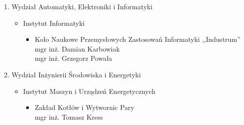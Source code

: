 \documentclass[ucs]{beamer}
\begin{document}
\begin{frame}
\begin{enumerate}
\setlength{\itemsep}{3pt}
\setlength{\parskip}{3pt}
\setlength{\parsep}{3pt}
\item Wydział Automatyki, Elektroniki i Informatyki
\begin{itemize}
\setlength{\itemsep}{3pt}
\setlength{\parskip}{3pt}
\setlength{\parsep}{3pt}
\item Instytut Informatyki
\begin{itemize}
\setlength{\itemsep}{3pt}
\setlength{\parskip}{3pt}
\setlength{\parsep}{3pt}
\item Koło Naukowe Przemysłowych Zastosowań Informatyki ,,Industrum''
\\ mgr inż. Damian Karbowiak
\\ mgr inż. Grzegorz Powała
\end{itemize}
\end{itemize}
\item  Wydział Inżynierii Środowiska i Energetyki
\begin{itemize}
\setlength{\itemsep}{3pt}
\setlength{\parskip}{3pt}
\setlength{\parsep}{3pt}
\item Instytut Maszyn i Urządzeń Energetycznych
\begin{itemize}
\setlength{\itemsep}{3pt}
\setlength{\parskip}{3pt}
\setlength{\parsep}{3pt}
\item Zakład Kotłów i Wytwornic Pary
\\ mgr inż. Tomasz Kress
\end{itemize}
\end{itemize}
\end{enumerate}
\end{frame}
\end{document}
